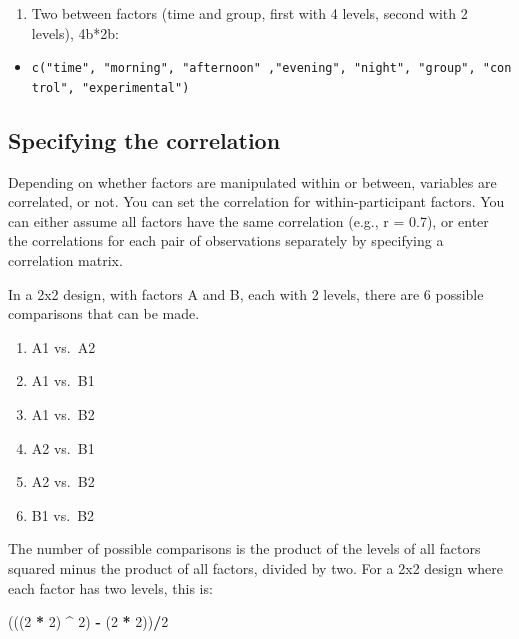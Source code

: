 \documentclass[]{book}
\newenvironment{Shaded}{\begin{snugshade}}{\end{snugshade}}
\newcommand{\DecValTok}[1]{\textcolor[rgb]{0.00,0.00,0.81}{#1}}
\newcommand{\NormalTok}[1]{#1}
\newcommand{\OperatorTok}[1]{\textcolor[rgb]{0.81,0.36,0.00}{\textbf{#1}}}
\newcommand{\StringTok}[1]{\textcolor[rgb]{0.31,0.60,0.02}{#1}}
\providecommand{\tightlist}{%
  \setlength{\itemsep}{0pt}\setlength{\parskip}{0pt}}
\begin{document}
\begin{enumerate}
\def\labelenumi{\arabic{enumi}.}
\setcounter{enumi}{2}
\tightlist
\item
  Two between factors (time and group, first with 4 levels, second with 2 levels), 4b*2b:
\end{enumerate}

\begin{itemize}
\tightlist
\item
  \texttt{c("time",\ "morning",\ "afternoon"\ ,"evening",\ "night",\ "group",\ "control",\ "experimental")}
\end{itemize}

\hypertarget{specifying-the-correlation}{%
\subsection{Specifying the correlation}\label{specifying-the-correlation}}

Depending on whether factors are manipulated within or between, variables are correlated, or not. You can set the correlation for within-participant factors. You can either assume all factors have the same correlation (e.g., r = 0.7), or enter the correlations for each pair of observations separately by specifying a correlation matrix.

In a 2x2 design, with factors A and B, each with 2 levels, there are 6 possible comparisons that can be made.

\begin{enumerate}
\def\labelenumi{\arabic{enumi}.}
\tightlist
\item
  A1 vs.~A2
\item
  A1 vs.~B1
\item
  A1 vs.~B2
\item
  A2 vs.~B1
\item
  A2 vs.~B2
\item
  B1 vs.~B2
\end{enumerate}

The number of possible comparisons is the product of the levels of all factors squared minus the product of all factors, divided by two. For a 2x2 design where each factor has two levels, this is:

\begin{Shaded}
\begin{Highlighting}[]
\NormalTok{(((}\DecValTok{2} \OperatorTok{*}\StringTok{ }\DecValTok{2}\NormalTok{) }\OperatorTok{^}\StringTok{ }\DecValTok{2}\NormalTok{) }\OperatorTok{-}\StringTok{ }\NormalTok{(}\DecValTok{2} \OperatorTok{*}\StringTok{ }\DecValTok{2}\NormalTok{))}\OperatorTok{/}\DecValTok{2}
\end{Highlighting}
\end{Shaded}
\end{document}
